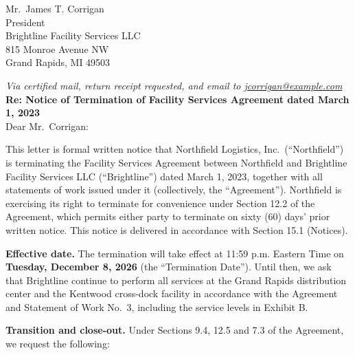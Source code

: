 \documentclass[11pt]{letter}
\date{October 7, 2026}
\begin{document}
\begin{letter}{Mr.\ James T. Corrigan\\
President\\
Brightline Facility Services LLC\\
815 Monroe Avenue NW\\
Grand Rapids, MI 49503}

\opening{\textit{Via certified mail, return receipt requested, and email to \href{mailto:jcorrigan@example.com}{jcorrigan@example.com}}\\[\medskipamount]
\textbf{Re: Notice of Termination of Facility Services Agreement dated March 1, 2023}\\[\medskipamount]
Dear Mr.\ Corrigan:}

This letter is formal written notice that Northfield Logistics, Inc.\ (``Northfield'') is terminating the Facility Services Agreement between Northfield and Brightline Facility Services LLC (``Brightline'') dated March 1, 2023, together with all statements of work issued under it (collectively, the ``Agreement''). Northfield is exercising its right to terminate for convenience under Section 12.2 of the Agreement, which permits either party to terminate on sixty (60) days' prior written notice. This notice is delivered in accordance with Section 15.1 (Notices).

\textbf{Effective date.} The termination will take effect at 11:59 p.m. Eastern Time on \textbf{Tuesday, December 8, 2026} (the ``Termination Date''). Until then, we ask that Brightline continue to perform all services at the Grand Rapids distribution center and the Kentwood cross-dock facility in accordance with the Agreement and Statement of Work No.~3, including the service levels in Exhibit B.

\textbf{Transition and close-out.} Under Sections 9.4, 12.5 and 7.3 of the Agreement, we request the following:


\end{letter}
\end{document}
